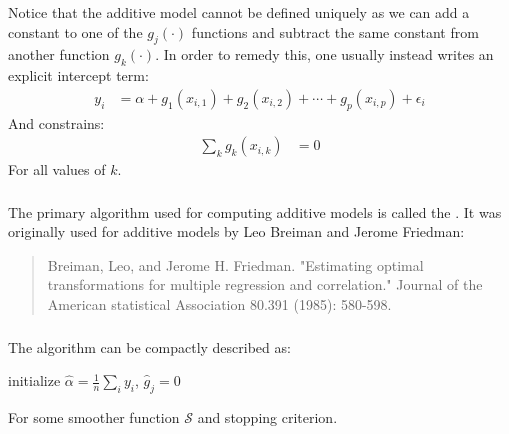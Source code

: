 \documentclass[xetex,mathserif,serif,aspectratio=169]{beamer}
\begin{document}
\begin{frame}[fragile] \frametitle{} \oldB \small

\textbf{}

Notice that the additive model cannot be defined uniquely as we can add a
constant to one of the $g_j(\cdot)$ functions and subtract the same constant from
another function $g_k(\cdot)$. In order to remedy this, one usually instead
writes an explicit intercept term:
\begin{align*}
y_i &= \alpha + g_1(x_{i,1}) + g_2(x_{i,2}) + \cdots + g_p(x_{i,p})  + \epsilon_i
\end{align*}
And constrains:
\begin{align*}
\sum_k g_k(x_{i,k}) &= 0
\end{align*}
For all values of $k$.

\end{frame}

\begin{frame}[fragile] \frametitle{} \oldB \small

\textbf{}

The primary algorithm used for computing additive models is called
the . It was originally used for additive
models by Leo Breiman and Jerome Friedman:
\begin{quote}
Breiman, Leo, and Jerome H. Friedman. "Estimating optimal transformations for multiple regression and correlation." Journal of the American statistical Association 80.391 (1985): 580-598.
\end{quote}

\end{frame}

\begin{frame}[fragile] \frametitle{} \oldB \small

\textbf{}

The algorithm can be compactly described as:
\begin{algorithm}[H]
 initialize $\widehat{\alpha} = \frac{1}{n} \sum_i y_i$, $\widehat{g}_j = 0$ \;
\end{algorithm}
For some smoother function $\mathcal{S}$ and stopping criterion.

\end{frame}
\end{document}
